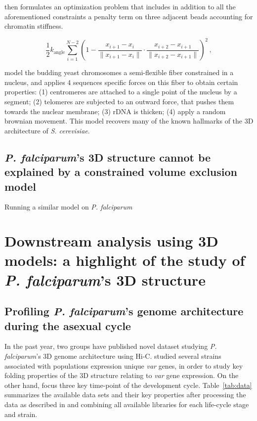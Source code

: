 \documentclass[letterpaper,12pt]{article}
\begin{document}
\citet{tjong:physical} then formulates an optimization problem that includes
in addition to all the aforementioned constraints a penalty term on three
adjacent beads accounting for chromatin stiffness.

\begin{equation}
\frac{1}{2} k_{\text{angle}} \sum^{N - 2}_{i = 1} \left( 1 - \frac{x_{i + 1} -
x_i}{\|x_{i + 1} - x_i\|} \cdot \frac{x_{i + 2} - x_{i + 1}}{\|x_{i + 2} -
  x_{i + 1}\|} \right)^2\,,
\end{equation}



\citet{tokuda:dynamical}

\citet{wong:how} model the budding yeast chromosomes a semi-flexible fiber
constrained in a nucleus, and applies 4 sequences specific forces on this
fiber to obtain certain properties: (1) centromeres are attached to a single
point of the nucleus by a segment; (2) telomeres are subjected to an outward
force, that pushes them towards the nuclear membrane; (3) rDNA is thicken; (4)
apply a random brownian movement. This model recovers many of the known
hallmarks of the 3D architecture of {\em S. cerevisiae}.


\subsection*{\textit{P. falciparum}'s 3D structure cannot be explained by a
constrained volume exclusion model}


Running a similar model on {\em P. falciparum}

\section*{Downstream analysis using 3D models: a highlight of the study of
{\em P. falciparum}'s 3D structure}

\subsection*{Profiling {\em P. falciparum}'s genome architecture during the
asexual cycle}
\label{sec:data}

In the past year, two groups have published novel dataset studying {\em P.
falciparum}'s 3D genome architecture using Hi-C. \citet{lemieux:genome-wide}
studied several strains associated with populations expression unique
\textit{var} genes, in order to study key folding properties of the 3D
structure relating to \textit{var} gene expression. On the other hand,
\citet{ay:three-dimensional} focus three key time-point of the development
cycle. Table~\ref{tab:data} summarizes the available data sets and their key
properties after processing the data as described in
\citet{ay:three-dimensional} and combining all available libraries for each
life-cycle stage and strain.
\end{document}

